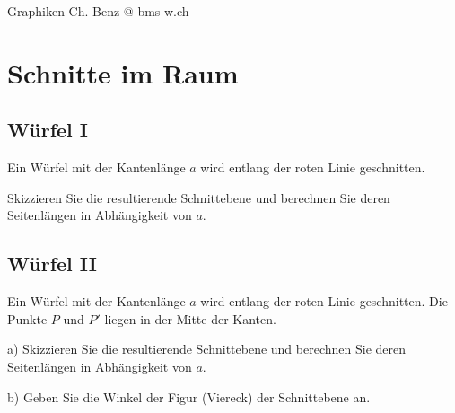 



\usepackage{amssymb} %
\renewcommand{\metaHeaderLine}{Arbeitsblatt Stereometrie}
\renewcommand{\arbeitsblattTitel}{Schnitte im Raum}

\arbeitsblattHeader{}

Graphiken Ch. Benz @ bms-w.ch

\setcounter{aufgabennummer}{1}


\section{Schnitte im Raum}

\subsection{Würfel I}

Ein Würfel mit der Kantenlänge $a$ wird entlang der roten
Linie geschnitten.

Skizzieren Sie die resultierende Schnittebene und berechnen
Sie deren Seitenlängen in Abhängigkeit von $a$.


\subsection{Würfel II}


Ein Würfel mit der Kantenlänge $a$ wird entlang der roten Linie
geschnitten. Die Punkte $P$ und $P'$ liegen in der Mitte der Kanten.

a) Skizzieren Sie die resultierende Schnittebene und berechnen
Sie deren Seitenlängen in Abhängigkeit von $a$.

b) Geben Sie die Winkel der Figur (Viereck) der Schnittebene an.


